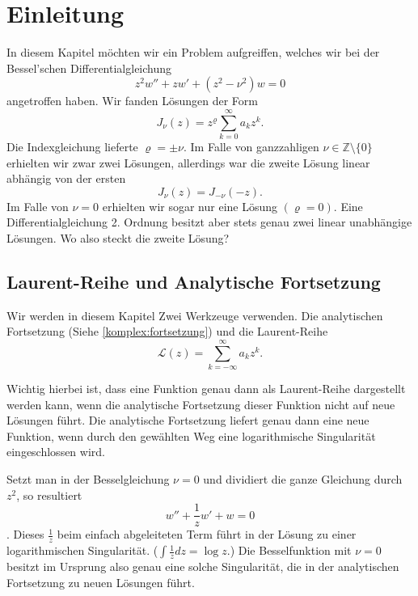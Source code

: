 \section{Einleitung}

In diesem Kapitel möchten wir ein Problem aufgreiffen, welches wir bei der Bessel'schen Differentialgleichung
$$ z^2w''+zw'+(z^2 - \nu^2)w=0$$
angetroffen haben. Wir fanden Lösungen der Form 
$$J_\nu(z)=z^\varrho\sum_{k=0}^{\infty}a_kz^k.$$
Die Indexgleichung lieferte $\varrho=\pm\nu.$
Im Falle von ganzzahligen $\nu\in\mathbb{Z}\setminus\{0\}$ erhielten wir zwar zwei Lösungen, allerdings war die zweite Lösung linear abhängig von der ersten $$J_\nu(z) = J_{-\nu}(-z).$$
Im Falle von $\nu=0$ erhielten wir sogar nur eine Lösung $(\varrho=0)$. Eine Differentialgleichung 2. Ordnung besitzt aber stets genau zwei linear unabhängige Lösungen. Wo also steckt die zweite Lösung?

\subsection{Laurent-Reihe und Analytische Fortsetzung}
Wir werden in diesem Kapitel Zwei Werkzeuge verwenden. Die analytischen Fortsetzung (Siehe \ref{komplex:fortsetzung}) und die Laurent-Reihe
$$\mathcal{L}(z)=\sum_{k=-\infty}^{\infty}a_kz^k.$$

Wichtig hierbei ist, dass eine Funktion genau dann als Laurent-Reihe dargestellt werden kann, wenn die analytische Fortsetzung dieser Funktion nicht auf neue Lösungen führt. Die analytische Fortsetzung liefert genau dann eine neue Funktion, wenn durch den gewählten Weg eine logarithmische Singularität eingeschlossen wird. 

Setzt man in der Besselgleichung $\nu=0$ und dividiert die ganze Gleichung durch $z^2$, so resultiert
$$ w''+\frac{1}{z}w'+w=0$$.
Dieses $\frac{1}{z}$ beim einfach abgeleiteten Term führt in der Lösung zu einer logarithmischen Singularität. ($\int\frac{1}{z}dz = \log z.$)
Die Besselfunktion mit $\nu=0$ besitzt im Ursprung also genau eine solche Singularität, die in der analytischen Fortsetzung zu neuen Lösungen führt.
